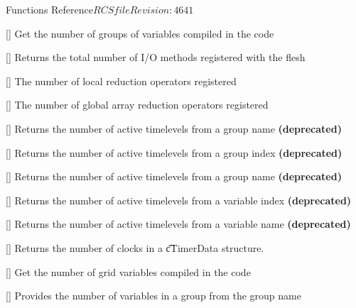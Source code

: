 \begin{cactuspart}{ Functions Reference}{$RCSfile$}{$Revision: 4641 $}
\begin{Lentry}
\item[\code{CCTK\_NumGroups}] [\pageref{CCTK-NumGroups}]
  Get the number of groups of variables compiled in the code

\item[\code{CCTK\_NumIOMethods}] [\pageref{CCTK-NumIOMethods}]
  Returns the total number of I/O methods registered with the flesh

\item[\code{CCTK\_NumLocalArrayReduceOperators}] [\pageref{CCTK-NumLocalArrayReduceOperators}]
  The number of local reduction operators registered

\item[\code{CCTK\_NumReductionArraysGloballyOperators}] [\pageref{CCTK-NumReductionArraysGloballyOperators}]
  The number of global array reduction operators registered

\item[\code{CCTK\_NumTimeLevels}] [\pageref{CCTK-NumTimeLevels}]
  Returns the number of active timelevels from a group name
  \textbf{(deprecated)}

\item[\code{CCTK\_NumTimeLevelsGI}] [\pageref{CCTK-NumTimeLevels}]
  Returns the number of active timelevels from a group index
  \textbf{(deprecated)}

\item[\code{CCTK\_NumTimeLevelsGN}] [\pageref{CCTK-NumTimeLevels}]
  Returns the number of active timelevels from a group name
  \textbf{(deprecated)}

\item[\code{CCTK\_NumTimeLevelsVI}] [\pageref{CCTK-NumTimeLevels}]
  Returns the number of active timelevels from a variable index
  \textbf{(deprecated)}

\item[\code{CCTK\_NumTimeLevelsVN}] [\pageref{CCTK-NumTimeLevels}]
  Returns the number of active timelevels from a variable name
  \textbf{(deprecated)}

\item[\code{CCTK\_NumTimerClocks}] [\pageref{CCTK-NumTimerClocks}]
  Returns the number of clocks in a {\t cTimerData} structure.

\item[\code{CCTK\_NumVars}] [\pageref{CCTK-NumVars}]
  Get the number of grid variables compiled in the code

\item[\code{CCTK\_NumVarsInGroup}] [\pageref{CCTK-NumVarsInGroup}]
  Provides the number of variables in a group from the group name


\end{Lentry}
\end{cactuspart}
